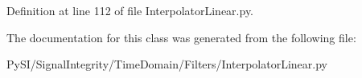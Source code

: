 Definition at line 112 of file Interpolator\+Linear.\+py.



The documentation for this class was generated from the following file\+:\begin{DoxyCompactItemize}
\item 
Py\+S\+I/\+Signal\+Integrity/\+Time\+Domain/\+Filters/Interpolator\+Linear.\+py\end{DoxyCompactItemize}
